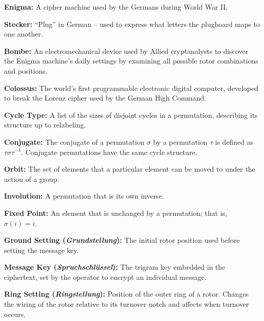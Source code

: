 \documentclass{article}
\begin{document}
    \begin{tcolorbox}[colback=white!95!gray, colframe=black!75, boxrule=0.8pt, arc=4pt, width=\textwidth,  title=Glossary, ]
    \slightlybigger
    \textbf{Enigma:} A cipher machine used by the Germans during World War II.

\vspace{1em}

\textbf{Stecker:} ``Plug'' in German -- used to express what letters the plugboard maps to one another.

\vspace{1em}

\textbf{Bombe:} An electromechanical device used by Allied cryptanalysts to discover the Enigma machine's daily settings by examining all possible rotor combinations and positions.

\vspace{1em}
\textbf{Colossus:} The world’s first programmable electronic digital computer, developed to break the Lorenz cipher used by the German High Command.

\vspace{1em}
\textbf{Cycle Type:}  A list of the sizes of disjoint cycles in a permutation, describing its structure up to relabeling. 

\vspace{1em}
\textbf{Conjugate:}  The conjugate of a permutation $\sigma$ by a permutation $\tau$ is defined as $\tau \sigma \tau^{-1}$. Conjugate permutations have the same cycle structure.

\vspace{1em}
\textbf{Orbit:} The set of elements that a particular element can be moved to under the action of a group.

\vspace{1em}
\textbf{Involution:} A permutation that is its own inverse.

\vspace{1em}
\textbf{Fixed Point:}  An element that is unchanged by a permutation; that is, $\sigma(i) = i$.


\vspace{1em}
\textbf{Ground Setting (\emph{Grundstellung}):} The initial rotor position used before setting the message key.

\vspace{1em}
\textbf{Message Key (\emph{Spruchschlüssel}):} The trigram key embedded in the ciphertext, set by the operator to encrypt an individual message.

\vspace{1em}
\textbf{Ring Setting (\emph{Ringstellung}):} Position of the outer ring of a rotor. Changes the wiring of the rotor relative to its turnover notch and affects when turnover occurs.


\end{tcolorbox}
\end{document}
